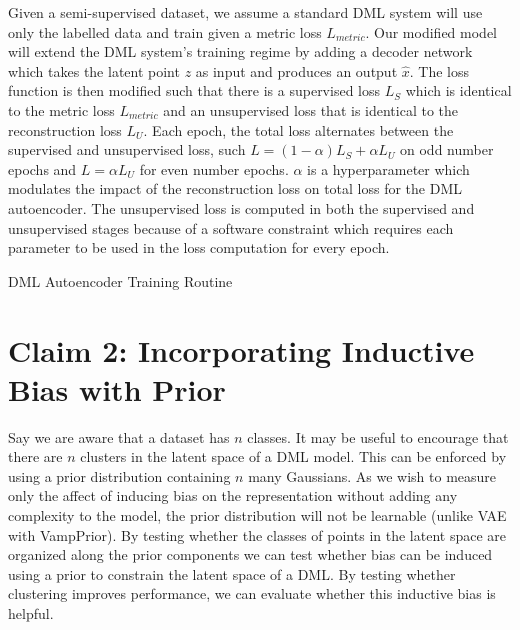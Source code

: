 \documentclass[./dissertation.tex]{subfiles}
\begin{document}
    Given a semi-supervised dataset, we assume a standard DML system will use only the labelled data and train given a metric loss $L_{metric}$. Our modified model will extend the DML system's training regime by adding a decoder network which takes the latent point $z$ as input and produces an output $\hat{x}$. The loss function is then modified such that there is a supervised loss $L_{S}$ which is identical to the metric loss $L_{metric}$ and an unsupervised loss that is identical to the reconstruction loss $L_{U}$. Each epoch, the total loss alternates between the supervised and unsupervised loss, such $L = (1 - \alpha) L_{S} + \alpha L_{U}$ on odd number epochs and $L = \alpha L_{U}$ for even number epochs. $\alpha$ is a hyperparameter which modulates the impact of the reconstruction loss on total loss for the DML autoencoder. The unsupervised loss is computed in both the supervised and unsupervised stages because of a software constraint which requires each parameter to be used in the loss computation for every epoch.  \\

    \begin{algorithm}
    \caption{DML Autoencoder Training Routine}\label{alg:two}
    \end{algorithm}    
    
    \section{Claim 2: Incorporating Inductive Bias with Prior}
    Say we are aware that a dataset has $n$ classes. It may be useful to encourage that there are $n$ clusters in the latent space of a DML model. This can be enforced by using a prior distribution containing $n$ many Gaussians. As we wish to measure only the affect of inducing bias on the representation without adding any complexity to the model, the prior distribution will not be learnable (unlike VAE with VampPrior). By testing whether the classes of points in the latent space are organized along the prior components we can test whether bias can be induced using a prior to constrain the latent space of a DML. By testing whether clustering improves performance, we can evaluate whether this inductive bias is helpful. \\
    
\end{document}
